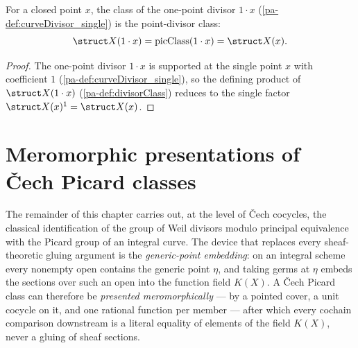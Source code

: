 \begin{theorem}
  \label{pa-thm:divisorClass_single}
  \leanok

  For a closed point \(x\), the class of the one-point divisor \(1 \cdot x\)
  (\ref{pa-def:curveDivisor_single}) is the point-divisor class:
  \[
    \struct X(1 \cdot x) = \mathrm{picClass}(1 \cdot x) = \struct X(x) .
  \]
\end{theorem}
\begin{proof}
  \leanok
  The one-point divisor \(1 \cdot x\) is supported at the single point \(x\) with coefficient \(1\)
  (\ref{pa-def:curveDivisor_single}), so the defining product of \(\struct X(1 \cdot x)\)
  (\ref{pa-def:divisorClass}) reduces to the single factor \(\struct X(x)^1 = \struct X(x)\).
\end{proof}

\section{Meromorphic presentations of \v Cech Picard classes}

The remainder of this chapter carries out, at the level of \v Cech cocycles, the classical
identification of the group of Weil divisors modulo principal equivalence with the Picard group
of an integral curve. The device that replaces every sheaf-theoretic gluing argument is the
\emph{generic-point embedding}: on an integral scheme every nonempty open contains the generic
point \(\eta\), and taking germs at \(\eta\) embeds the sections over such an open into the
function field \(K(X)\). A \v Cech Picard class can therefore be \emph{presented meromorphically}
--- by a pointed cover, a unit cocycle on it, and one rational function per member --- after
which every cochain comparison downstream is a literal equality of elements of the field
\(K(X)\), never a gluing of sheaf sections.

